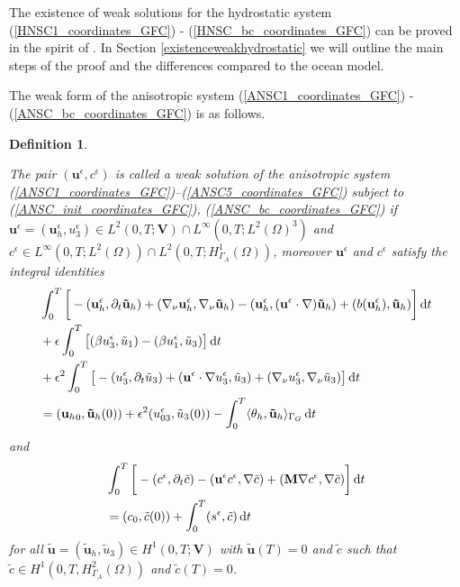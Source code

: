 \documentclass[12pt]{report}
\numberwithin{theorem}{chapter}
\numberwithin{corollary}{chapter}
\numberwithin{lemma}{chapter}
\numberwithin{remark}{chapter}
\newtheorem{definition}{Definition}
\numberwithin{definition}{chapter}
\numberwithin{prop}{chapter}
\newcommand*\diff{\mathop{}\!\mathrm{d}}
\begin{document}
The existence of weak solutions for the hydrostatic system (\ref{HNSC1_coordinates_GFC}) - (\ref{HNSC_bc_coordinates_GFC}) can be proved in the spirit of \cite{temam2005some}. In Section \ref{existenceweakhydrostatic} we will outline the main steps of the proof and the differences compared to the ocean model.

The weak form of the anisotropic system (\ref{ANSC1_coordinates_GFC}) - (\ref{ANSC_bc_coordinates_GFC}) is as follows.
  
\begin{definition} \label{definitionanisotropicWF_gfc}

The pair $(\mathbf{u}^\epsilon, c^\epsilon)$ is called a weak solution of the anisotropic system (\ref{ANSC1_coordinates_GFC})--(\ref{ANSC5_coordinates_GFC}) subject to (\ref{ANSC_init_coordinates_GFC}), (\ref{ANSC_bc_coordinates_GFC}) if $\mathbf{u}^\epsilon = (\mathbf{u}^\epsilon_h, u^\epsilon_3) \in L^2 (0,T ; \mathbf{V}) \cap L^\infty (0, T; L^2 (\Omega)^3)$ and $c^\epsilon \in L^\infty (0,T; L^2(\Omega)) \cap L^2 (0,T; H^1_{\Gamma_A}(\Omega))$, moreover $\mathbf{u}^\epsilon$ and $c^\epsilon$ satisfy the integral identities
%
\begin{equation}
\begin{split}
& \int_0^T \bigg [ -(\mathbf{u}^\epsilon_h, \partial_t \mathbf{\tilde{u}}_h) + (\nabla_\nu \mathbf{u}^\epsilon_h, \nabla_\nu \mathbf{\tilde{u}}_h) - (\mathbf{u}^\epsilon_h, (\mathbf{u}^\epsilon \cdot \nabla) \mathbf{\tilde{u}}_h) + (b(\mathbf{u}^\epsilon_h), \mathbf{\tilde{u}}_h) \bigg ] \diff t \\
& + \epsilon \int_0 ^ T \big [ (\beta u_3 ^\epsilon, \tilde{u}_1) - (\beta u_1^\epsilon, \tilde{u}_3) \big ] \diff t\\
& + \epsilon^2 \int _0 ^ T \big [ -(u_3^\epsilon, \partial_t \tilde{u}_3) +(\mathbf{u}^\epsilon \cdot \nabla u_3 ^ \epsilon, \tilde{u}_3) + (\nabla_\nu u_3^\epsilon, \nabla_\nu \tilde{u}_3) \big ] \diff t \\
& = ({\mathbf{u}_h}_0, \mathbf{\tilde{u}}_h(0)) + \epsilon^2 (u_{03}^\epsilon, \tilde{u}_3 (0)) - \int_0^T \langle \theta_h, \mathbf{\tilde{u}}_h \rangle_{\Gamma_G} \diff t \raisetag{20pt} \label{anisotropicWF_U}
\end{split}
\end{equation}
%
and
%
\begin{equation}
\begin{split}
& \int_0^T \bigg [ -(c^\epsilon, \partial_t \tilde{c}) -(\mathbf{u}^\epsilon c^\epsilon, \nabla \tilde{c}) + (\mathbf{M} \nabla c^\epsilon, \nabla \tilde{c}) \bigg ] \diff t \\
& =  (c_0, \tilde{c} (0)) + \int_0^T (s^\epsilon,\tilde{c}) \diff t \raisetag{20pt} \label{anisotropicWF_C}
\end{split}
\end{equation}
%
for all $\mathbf{\tilde{u}} = (\mathbf{\tilde{u}}_h, \tilde{u}_3) \in H^1 (0,T;\mathbf{V})$ with $\mathbf{\tilde{u}}(T) = 0$ and $\tilde{c}$ such that $\tilde{c} \in H^1 (0,T, H^2_{\Gamma_A} (\Omega))$ and $\tilde{c} (T) = 0$.

\end{definition}
\end{document}
